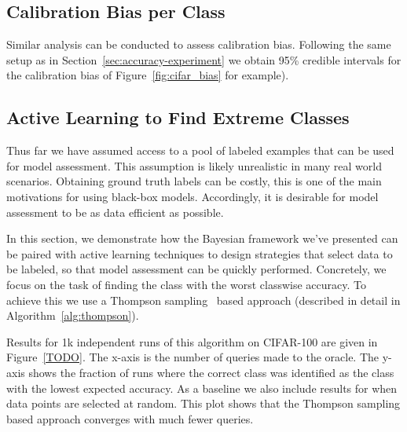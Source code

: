 \documentclass{article}
\begin{document}


\subsection{Calibration Bias per Class}

Similar analysis can be conducted to assess calibration bias.
Following the same setup as in Section~\ref{sec:accuracy-experiment} we obtain 95\% credible intervals for the calibration bias of
Figure~\ref{fig:cifar_bias} for example).





\subsection{Active Learning to Find Extreme Classes}

Thus far we have assumed access to a pool of labeled examples that can be used for model assessment.
This assumption is likely unrealistic in many real world scenarios.
Obtaining ground truth labels can be costly, this is one of the main motivations for using black-box models.
Accordingly, it is desirable for model assessment to be as data efficient as possible.

In this section, we demonstrate how the Bayesian framework we've presented can be paired with active learning techniques to design strategies that select data to be labeled, so that model assessment can be quickly performed.
Concretely, we focus on the task of finding the class with the worst classwise accuracy.
To achieve this we use a Thompson sampling~\cite{TODO} based approach (described in detail in Algorithm~\ref{alg:thompson}).

Results for 1k independent runs of this algorithm on CIFAR-100 are given in Figure~\ref{TODO}.
The x-axis is the number of queries made to the oracle.
The y-axis shows the fraction of runs where the correct class was identified as the class with the lowest expected accuracy.
As a baseline we also include results for when data points are selected at random.
This plot shows that the Thompson sampling based approach converges with much fewer queries.
\end{document}

